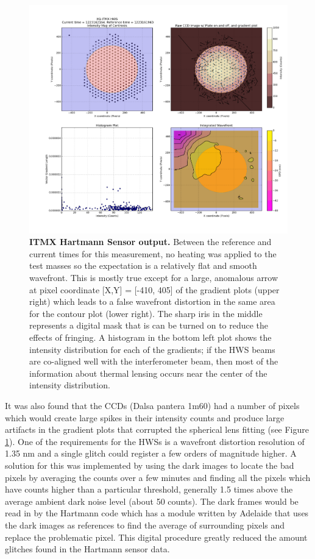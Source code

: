 	\begin{figure}[!]
		\centering
		\includegraphics[width=0.7\textheight]{../Figures/20181011_ITMX_HWS_histogram_Masked.png}
		\caption[ITMX Hartmann Sensor output.] 
		{\textbf{ITMX Hartmann Sensor output.} Between the reference and current times for this measurement, no heating was applied to the test masses so the expectation is a relatively flat and smooth wavefront. This is mostly true except for a large, anomalous arrow at pixel coordinate [X,Y] = [-410, 405] of the gradient plots (upper right) which leads to a false wavefront distortion in the same area for the contour plot (lower right).  The sharp iris in the middle represents a digital mask that is can be turned on to reduce the effects of fringing.  A histogram in the bottom left plot shows the intensity distribution for each of the gradients; if the HWS beams are co-aligned well with the interferometer beam, then most of the information about thermal lensing occurs near the center of the intensity distribution.}
		\label{fig:HWS_Histogram}
	\end{figure}

	It was also found that the CCDs (Dalsa pantera 1m60) had a number of pixels which would create large spikes in their intensity counts and produce large artifacts in the gradient plots that corrupted the spherical lens fitting (see Figure \ref{fig:HWS_Histogram}).  One of the requirements for the HWSs is a wavefront distortion resolution of 1.35 nm \cite{AWC_current} and a single glitch could register a few orders of magnitude higher.  A solution for this was implemented by using the dark images to locate the bad pixels by averaging the counts over a few minutes and finding all the pixels which have counts higher than a particular threshold, generally 1.5 times above the average ambient dark noise level (about 50 counts).  The dark frames would be read in by the Hartmann code which has a module written by Adelaide that uses the dark images as references to find the average of surrounding pixels and replace the problematic pixel.  This digital procedure greatly reduced the amount glitches found in the Hartmann sensor data.
	
